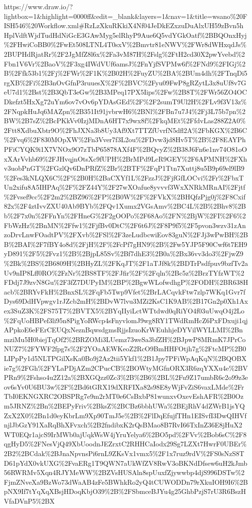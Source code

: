 \documentclass[11pt]{article}
\begin{document}
https://www.draw.io/?lightbox=1\&highlight=0000ff\&edit=\_blank\&layers=1\&nav=1\&title=wsano\%20FISH546\%20Workflow.xml\#RzLzXkuRKkiX4Nf04JeDkEZxzuDuAlxUH59zBvn5hHplVdftWjdTudHdNiGcE3GAwMyg5elRhyP9Aue6Q5vdYGkOatf\%2BBQOnxHyj\%2FHwiCoBB0\%2FwEt508LTNL4T0sxV\%2Bmvtr81eNWV\%2FWr8dWHxqdJs\%2BUPHdRjatRr\%2F2JgMfZ8l6x\%2Fa3vM87H\%2Fslg\%2FtH2cd30X2pwYvebd\%2Fbn1V6Vr\%2BaoV\%2F3xg4IWdVUf6amsJ\%2FnYjfSVPMw6f\%2FNd9\%2FIGj\%2B\%2Ffk53b1\%2Fj\%2FWr\%2F1K\%2B02H\%2FuyZU\%2BA\%2BUm4dh\%2FTnqDi5rgXB\%2Fi\%2B3nOvGfnP3ruuesX\%2F\%2BVC\%2Fyu09FwP8gRZytL3x8uUf8v7GeU7d1\%2Bst\%2B3QbT3eGw\%2B3MPeq17PX5Iips\%2Fw\%2B8T\%2FWr56ZO4OCDkefzt5HxXg72uYm6ov7vOv6pYDAsGEd\%2F\%2F2sumT9Ul2H\%2FLv9f3V13z\%2FNqpkHuJq6MAZpn\%2B351It91jvbrwH6\%2BNl\%2FBn7u7J4\%2Fj3L75b7pn\%2BW\%2B7sZ\%2BcPKkVv0IzjMDnA6HT7x9wx8f\%2FkqMEt\%2FfdvLas288Z2A0\%2Ftt8XdbuXbtr9O\%2FhJXNa3b8Uy3Af9Xt7TTZfUvrfN5dfl2A\%2FbKGX\%2B6C\%2Fvq6\%2F830MOpXW\%2Fn3Vver7f3L2ou\%2FDvw3jd8Hv5T\%2B\%2F8EAYPhPFiCYQK9i1X7VNOx9O7zTbP65878AXf4F\%2BQvyZ\%2B38J6Fn6e1nv74O81oOxXArVvhb69\%2FJHvqjnOtsXc9fUPH\%2BrMPd9LcR9GEY\%2F6APMNH\%2FXhv3uobPnGT\%2FGzlQv6DnPRfZ\%2Br\%2BTF\%2FqP1Ttn7Xuttj8u5B9p69el9lB9\%2Fes3kNLQX6C\%2F\%2B0H\%2BaCXYf1L\%2FzzJ\%2FjfGfLOCvi\%2Fr\%2FbxTUn2xifu8A5IHPAq\%2F\%2FZ44Y\%2F27wXOafue8yvvvf3WxXNRkMRnAI\%2Fjtf\%2Fvsef9cc\%2F2m2\%2BZ96\%2FP\%2B0W\%2F\%2FVkX\%2BHQfzPjg0j\%2F8Cxif82x\%2F4ztIvvZXU40Ab9BYb\%2FQv1Xumx2VGsAmv\%2BC4L\%2B\%2Bhv8\%2Bb\%2F7x0n\%2FFnYn\%2FHneG\%2F2gOOPo\%2F68Ao\%2FN\%2BjW\%2FI\%2F6\%2FbWzHz\%2BnMN\%2Ffw1\%2FjfBv0DtC\%2F6t6J\%2F8P9f5\%2F5pvon3wzv31zAnzoDrvLnwFOadtPV\%2FXvb\%2FSl\%2F3zeLudbcwiEov83guN\%2FJj3wPwBH\%2BB\%2BAI\%2F7fBY4o8d\%2FjH\%2F\%2FcPf7gHN9\%2B\%2Fw5YJP5F90Cwf6t7EH9yD891\%2F5\%2Fvz1\%2B\%2BjpL85Sv\%2Bf7dhE3\%2B0a\%2Bx36vv3do3\%2FjwZ9\%2Bk\%2BS\%2B6809H\%2BHyZL\%2FKqJT\%2F1aTJf8k\%2BDTrPsdfpuv9bzfTv2aUv9nIP8Lff0RO\%2FzNr\%2BS8TF\%2FJfir\%2F\%2Fqln\%2Bc5z\%2BrzTYfzWT\%2FDdj7J9zvN8Gu\%2F3fZ7DUPyIM\%2BP\%2BgwWLofwdhgP\%2FODH\%2BR638Hacb\%2BRYvFkH\%2BnxSL\%2FqFb5Twp9Vfet\%2BrLACqvkFtw7zlp7WKq1Gvr7fDys69DdHVpwgv1rJZcb2mH\%2BDvW7lvu3MZi2KsC1K9AB\%2B17Gn2p0Xh1Axex3SuZ3K\%2FS75T7\%2BVTX5\%2BYqIIyiLctWTtdwd0qRiYO4f03uUwqO4j2Lo\%2FqUoHBPef3li95n8PigYoRWcp4sFnyvlomJ9wg8RY1TWdRmHcZ6PxFDxuji1qjAPpkoE6eFErCEUQxNeznBqwsdgmsRjjsIzuoKrWEuhhjeDYVilWYLLMI\%2BnmziMu5H0biejTqOf2\%2BRZOMi3LUemz73weSa3bfZH\%2BJpwP8MRmK7JPrCoNUZ7\%2FYWF2fpg7s\%2F2YOaAEWKeoZ2RcO9BmHHFOtjh7g\%2FtcMP\%2B0LIPpPy1d5NLTPGilXsKa0Bo9j2Az2tii5Ykf1\%2B1Jpy7PFiWpAqKqN\%2BQOBXie7g\%2FGh\%2FYLaPDjAZm2CPucCB\%2BOWtyMGfnORX3R6zqYXXu4e\%2BVPRn9\%2Fshso4u2Z12a\%2BXGQzz0Zc3\%2B\%2B6\%2BL\%2Fu9Z17umbR6c2o99z3eov6sYv0U6BU3w\%2F\%2Bd6tGRX19dXRFIXa82s98E8yWjFvZiS6vaxLMde\%2FrTbI0EKNGXRC2OBSPRg7e9m2rMT0e6CsBxbP81wunxvOxevEshAFR\%2B0Ozm5JRNZ\%2Bn\%2BEPyFriv\%2BksZ\%2BCBz6bbhUWa\%2BEjRhV4dZWrB1jsYQZxX2X0\%2Bn1d0eyKbrLm9Xp90TmJ5e\%2B\%2FlDqEfujfTHn1EISvfI3DwQIHVfnjlJbGzY91XaRqBhXFvxch\%2B2fndibxK2rQsBMao8B7RvI66TxInZ36E8jHuX2WT0EQr1ajcS9IrMWb0ajUqkWsW4jYruYelya6\%2BO5pd\%2FVv\%2Bob6sC\%2F8qgHyD5\%2FNesVjQ49XbUoodnJEZrxtC2RHHCaIodx29Sg7LZXt7HwrF0UBEr\%2B2\%2BCdak\%2BJnaNpvnsPi6rnL9ZKsVx1vmx5\%2F1x7ruz9rdV\%2FS0sNzS8TD61pYdX0vkUXG\%2FvaERg1T9QWN7aUkWfZV8RwV3oBKNdDfsew6uH2kJmb56RWRMv5Xqn4RJYMeWW\%2BZVsHUSAln8spUuxfZjywwbp4djS996DSTw\%2FjmZNveXa9BzWo73dWaAB4zFe5BWhkRo2yQ4tCUWODDn79rXkuIOH9I6\%2BpNX9If7tYqXqXBsjHDoqKbjO39\%2B\%2FSbmceBJYu4g25GhbPzjS7rU3R6BszHVfaDVnP5\%2BX
\end{document}
